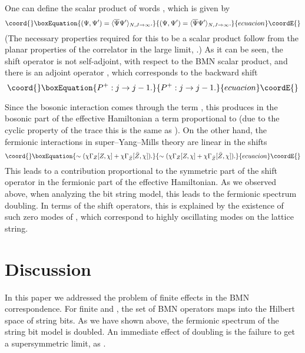 \documentclass[a4paper]{article}
\providecommand{\tr}{\mathop{\mathrm{tr}}\nolimits}
\begin{document}
One can define the scalar product of words \coordHE{}, which is given by
\begin{equation}\coord{}\boxEquation{
  (\Psi,\Psi')=\langle \overline{\Psi}\Psi'\rangle_{N,J\to\infty}.
}{
  (\Psi,\Psi')=\langle \overline{\Psi}\Psi'\rangle_{N,J\to\infty}.
}{ecuacion}\coordE{}\end{equation}
(The necessary properties required for this to be a scalar product
follow from the planar properties of the correlator in the large
\coordHE{} limit, \cite{Berenstein:2002jq}.)
As it can be seen, the shift operator \coordHE{} is not self-adjoint,
with respect to the BMN scalar product, and there is an adjoint
operator \coordHE{}, which corresponds to the backward shift
\begin{equation}\coord{}\boxEquation{
  P^+:j\to j-1.
}{
  P^+:j\to j-1.
}{ecuacion}\coordE{}\end{equation}

Since the bosonic interaction comes through the term \myHighlight{$\sim
g^2_{YM}\tr[Z,\phi][\bar{Z},\phi]$}\coordHE{}, this produces in the bosonic
part of the effective Hamiltonian a term proportional to \coordHE{}
(due to the cyclic property of the trace this is the same as
\coordHE{}). On the other hand, the fermionic interactions in
super--Yang--Mills theory are linear in the shifts
\begin{equation}\coord{}\boxEquation{
  \sim (\chi\Gamma_Z[Z,\chi]+\chi\Gamma_{\bar{Z}}[\bar{Z},\chi]).
}{
  \sim (\chi\Gamma_Z[Z,\chi]+\chi\Gamma_{\bar{Z}}[\bar{Z},\chi]).
}{ecuacion}\coordE{}\end{equation}
This leads to a contribution proportional to the symmetric part of
the shift operator \coordHE{} in the fermionic part of the
effective Hamiltonian. As we observed above, when analyzing the
bit string model, this leads to the fermionic spectrum doubling.
In terms of the shift operators, this is explained by the
existence of such zero modes of \coordHE{}, which correspond to
highly oscillating modes on the lattice string.

\section{Discussion}
In this paper we addressed the problem of finite \coordHE{} effects in
the BMN correspondence. For finite \coordHE{} and \coordHE{}, the set of BMN
operators maps into the Hilbert space of \coordHE{} string bits. As we
have shown above, the fermionic spectrum of the string bit model
is doubled. An immediate effect of doubling is the failure to get
a supersymmetric limit, as \coordHE{}.
\end{document}

